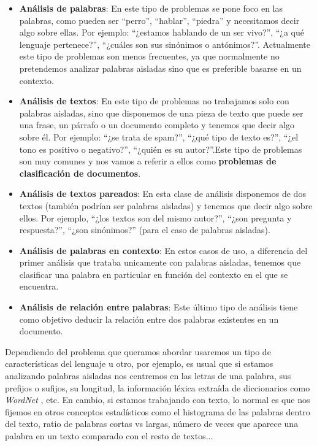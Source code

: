 \begin{itemize}
	\item \textbf{Análisis de palabras}: En este tipo de problemas se pone foco en las palabras, como pueden ser ``perro'', ``hablar'', ``piedra'' y necesitamos decir algo sobre ellas. Por ejemplo: ``¿estamos hablando de un ser vivo?'', ``¿a qué lenguaje pertenece?'', ``¿cuáles son sus sinónimos o antónimos?''. Actualmente este tipo de problemas son menos frecuentes, ya que normalmente no pretendemos analizar palabras aisladas sino que es preferible basarse en un contexto. 
	
	\item \textbf{Análisis de textos}:  En este tipo de problemas no trabajamos solo con palabras aisladas, sino que disponemos de una pieza de texto que puede ser una frase, un párrafo o un documento completo y tenemos que decir algo sobre él. Por ejemplo: ``¿se trata de spam?'', ``¿qué tipo de texto es?'', ``¿el tono es positivo o negativo?'', ``¿quién es su autor?''.Este tipo de problemas son muy comunes y nos vamos a referir a ellos como \textbf{problemas de clasificación de documentos}.   
	
	\item \textbf{Análisis de textos pareados}: En esta clase de análisis disponemos de  dos textos (también podrían ser palabras aisladas) y tenemos que decir algo sobre ellos. Por ejemplo, ``¿los textos son del mismo autor?'', ``¿son pregunta y respuesta?'', ``¿son sinónimos?'' (para el caso de palabras aisladas).
	
	\item \textbf{Análisis de palabras en contexto}: En estos casos de uso, a diferencia del primer análisis que trataba unicamente con  palabras aisladas, tenemos que clasificar una palabra en particular en función del contexto en el que se encuentra. 
	
	\item \textbf{Análisis de relación entre palabras}: Este último tipo de análisis tiene como objetivo deducir la relación entre dos palabras existentes en un documento. 
	
\end{itemize}

Dependiendo del problema que queramos abordar usaremos un tipo de características del lenguaje u otro, por ejemplo, es usual que si estamos analizando palabras aisladas nos centremos en las letras de una palabra, sus prefijos o sufijos, su longitud, la información léxica extraída de diccionarios como \textit{WordNet} \cite{wordnet}, etc. En cambio, si estamos trabajando con texto, lo normal es que nos fijemos en otros conceptos estadísticos como el histograma de las palabras dentro del texto, ratio de palabras cortas vs largas, número de veces que aparece una palabra en un texto comparado con el resto de textos...  

